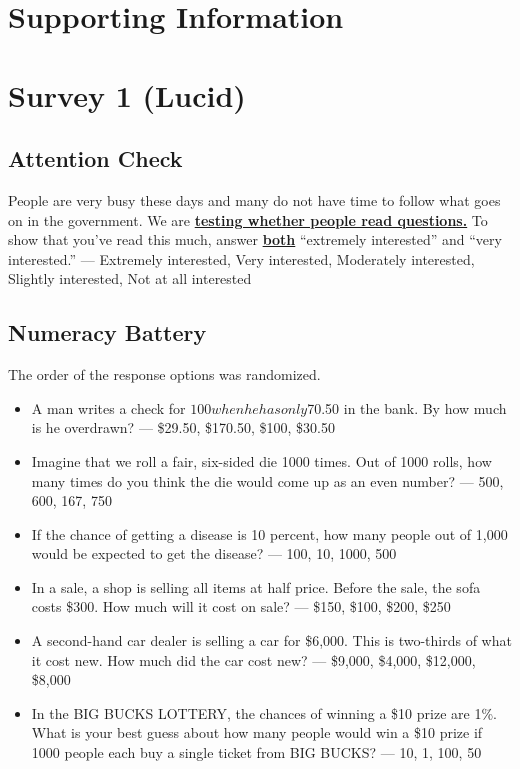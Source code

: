 \documentclass[12pt, letterpaper]{article}
\begin{document}
\section*{Supporting Information}\label{si}

\section{Survey 1 (Lucid)}

\subsection{Attention Check}
People are very busy these days and many do not have time to follow what goes on in the government. We are \textbf{\underline{testing whether people read questions.}} To show that you've read this much, answer \textbf{\underline{both}} ``extremely interested'' and ``very interested.'' --- Extremely interested, Very interested, Moderately interested,  Slightly interested, Not at all interested

\subsection{Numeracy Battery}

The order of the response options was randomized.

\begin{itemize}
    \item A man writes a check for $100 when he has only $70.50 in the bank. By how much is he overdrawn? — \$29.50, \$170.50, \$100, \$30.50
    \item Imagine that we roll a fair, six-sided die 1000 times. Out of 1000 rolls, how many times do you think the die would come up as an even number? — 500, 600, 167, 750
    \item If the chance of getting a disease is 10 percent, how many people out of 1,000 would be expected to get the disease? — 100, 10, 1000, 500
    \item In a sale, a shop is selling all items at half price. Before the sale, the sofa costs \$300. How much will it cost on sale? — \$150, \$100, \$200, \$250
    \item A second-hand car dealer is selling a car for \$6,000. This is two-thirds of what it cost new. How much did the car cost new? — \$9,000, \$4,000, \$12,000, \$8,000
    \item In the BIG BUCKS LOTTERY, the chances of winning a \$10 prize are 1\%. What is your best guess about how many people would win a \$10 prize if 1000 people each buy a single ticket from BIG BUCKS? — 10, 1, 100, 50
\end{itemize}
\end{document}
